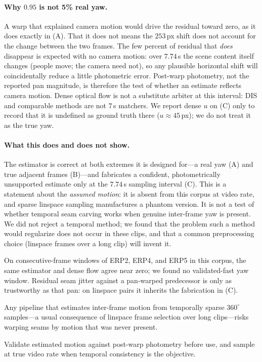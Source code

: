 \paragraph{Why $0.95$ is not 5\% real yaw.}
A warp that explained camera motion would drive the residual toward zero,
as it does exactly in (A). That it does not means the $253$\,px shift does
not account for the change between the two frames. The few percent of
residual that \emph{does} disappear is expected with no camera motion: over
$7.74$\,s the scene content itself changes (people move; the camera need
not), so any plausible horizontal shift will coincidentally reduce a
little photometric error. Post-warp photometry, not the reported pan
magnitude, is therefore the test of whether an estimate reflects camera
motion. Dense optical flow is not a substitute arbiter at this interval:
DIS and comparable methods are not $7$\,s matchers. We report dense $u$
on (C) only to record that it is undefined as ground truth there
($u \approx 45$\,px); we do not treat it as the true yaw.

\paragraph{What this does and does not show.}
The estimator is correct at both extremes it is designed for---a real yaw
(A) and true adjacent frames (B)---and fabricates a confident,
photometrically unsupported estimate only at the $7.74$\,s sampling
interval (C). This is a statement about the \emph{assumed motion}: it is
absent from this corpus at video rate, and sparse linspace sampling
manufactures a phantom version. It is not a test of whether temporal seam
carving works when genuine inter-frame yaw is present. We did not reject a
temporal method; we found that the problem such a method would regularize
does not occur in these clips, and that a common preprocessing choice
(linspace frames over a long clip) will invent it.

On consecutive-frame windows of ERP2, ERP4, and ERP5 in this corpus, the
same estimator and dense flow agree near zero; we found no
validated-fast yaw window. Residual seam jitter against a pan-warped
predecessor is only as trustworthy as that pan: on linspace pairs it
inherits the fabrication in (C).

Any pipeline that estimates inter-frame motion from temporally sparse
$360^\circ$ samples---a usual consequence of linspace frame selection over
long clips---risks warping seams by motion that was never present.

Validate estimated motion against post-warp photometry before use, and
sample at true video rate when temporal consistency is the objective.
